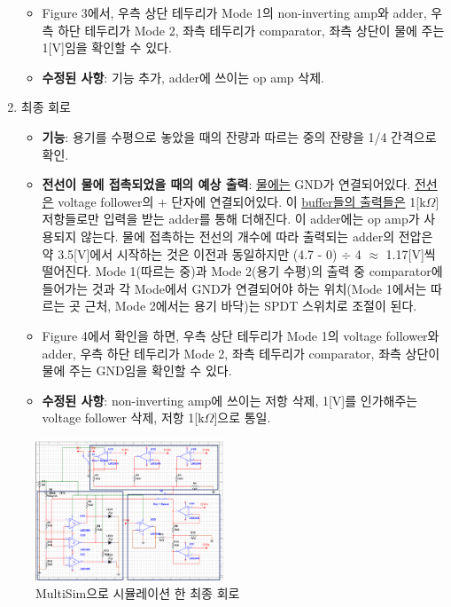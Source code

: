\documentclass[a4paper,itemph]{oblivoir}
\theoremstyle{definition}
\begin{document}
\begin{enumerate}
\begin{itemize}
        \item Figure 3에서, 우측 상단 테두리가 Mode 1의 non-inverting amp와 adder, 우측 하단 테두리가 Mode 2, 좌측 테두리가 comparator, 좌측 상단이 물에 주는 1[V]임을 확인할 수 있다.
        \item \textbf{수정된 사항}: 기능 추가, adder에 쓰이는 op amp 삭제.
    \end{itemize}
    \item 최종 회로
    \begin{itemize}
        \item \textbf{기능}: 용기를 수평으로 놓았을 때의 잔량과 따르는 중의 잔량을 1/4 간격으로 확인.
        \item \textbf{전선이 물에 접촉되었을 때의 예상 출력}: \underline{물에는} GND가 연결되어있다. \underline{전선은} voltage follower의 + 단자에 연결되어있다. 이 \underline{buffer들의 출력들은} 1[k$\Omega$] 저항들로만 입력을 받는 adder를 통해 더해진다. 이 adder에는 op amp가 사용되지 않는다. 물에 접촉하는 전선의 개수에 따라 출력되는 adder의 전압은 약 3.5[V]에서 시작하는 것은 이전과 동일하지만 (4.7 - 0) $\div$ 4 $\approx$ 1.17[V]씩 떨어진다. Mode 1(따르는 중)과 Mode 2(용기 수평)의 출력 중 comparator에 들어가는 것과 각 Mode에서 GND가 연결되어야 하는 위치(Mode 1에서는 따르는 곳 근처, Mode 2에서는 용기 바닥)는 SPDT 스위치로 조절이 된다.
        \item Figure 4에서 확인을 하면, 우측 상단 테두리가 Mode 1의 voltage follower와 adder, 우측 하단 테두리가 Mode 2, 좌측 테두리가 comparator, 좌측 상단이 물에 주는 GND임을 확인할 수 있다.
        \item \textbf{수정된 사항}: non-inverting amp에 쓰이는 저항 삭제, 1[V]를 인가해주는 voltage follower 삭제, 저항 1[k$\Omega$]으로 통일.
    \end{itemize}
\end{enumerate}

\begin{figure}[hb]
\centering
\includegraphics[width=0.5\textwidth]{3rd.png}
\caption{MultiSim으로 시뮬레이션 한 최종 회로}
\end{figure}
\end{document}
